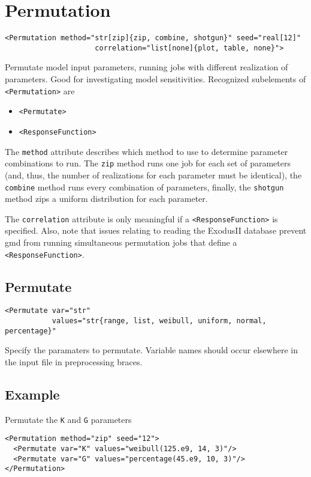 \documentclass[11pt]{report}
\renewcommand{\tag}[1]{\texttt{<#1>}}
\begin{document}
\section{Permutation}
\begin{verbatim}
<Permutation method="str[zip]{zip, combine, shotgun}" seed="real[12]"
                     correlation="list[none]{plot, table, none}">
\end{verbatim}
%
Permutate model input parameters, running jobs with different realization of
parameters. Good for investigating model sensitivities. Recognized subelements
of \tag{Permutation} are

\begin{itemize}
  \item \tag{Permutate}
  \item \tag{ResponseFunction}
\end{itemize}

The \texttt{method} attribute describes which method to use to determine
parameter combinations to run.  The \texttt{zip} method runs one job for each
set of parameters (and, thus, the number of realizations for each parameter
must be identical), the \texttt{combine} method runs every combination of
parameters, finally, the \texttt{shotgun} method zips a uniform distribution
for each parameter.

The \texttt{correlation} attribute is only meaningful if a
\tag{ResponseFunction} is specified.  Also, note that issues relating to
reading the ExodusII database prevent gmd from running simultaneous
permutation jobs that define a \tag{ResponseFunction}.


\subsection{Permutate}
\begin{verbatim}
<Permutate var="str"
           values="str{range, list, weibull, uniform, normal, percentage}"
\end{verbatim}
%
Specify the paramaters to permutate. Variable names should occur elsewhere in
the input file in preprocessing braces.

\subsection{Example}
Permutate the \texttt{K} and \texttt{G} parameters
%
\begin{verbatim}
<Permutation method="zip" seed="12">
  <Permutate var="K" values="weibull(125.e9, 14, 3)"/>
  <Permutate var="G" values="percentage(45.e9, 10, 3)"/>
</Permutation>
\end{verbatim}
\end{document}
